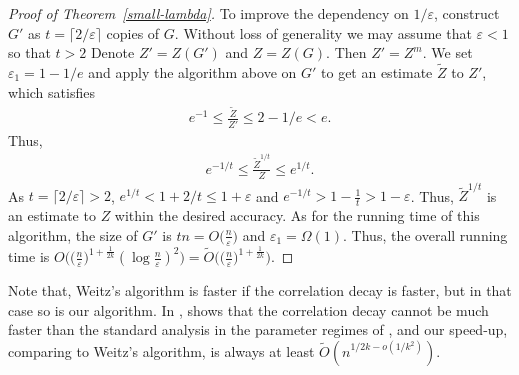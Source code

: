 \documentclass{theoretics}
\newcommand{\ceil}[1]{\lceil#1\rceil}
\newcommand{\eps}{\varepsilon}
\begin{document}
\begin{proof}[Proof of Theorem~\ref{small-lambda}]
  To improve the dependency on $1/\eps$,
  construct $G'$ as $t=\ceil{2/\eps}$ copies of $G$.
  Without loss of generality we may assume that $\eps<1$ so that $t>2$
  Denote $Z'=Z(G')$ and $Z=Z(G)$.
  Then $Z'=Z^m$.
  We set $\eps_1=1-1/e$ and apply the algorithm above on $G'$ to get an estimate $\widetilde{Z}$ to $Z'$,
  which satisfies
  \begin{align*}
    e^{-1}\le\frac{\widetilde{Z}}{Z'}\le 2-1/e < e.
  \end{align*}
  Thus,
  \begin{align*}
    e^{-1/t}\le \frac{\widetilde{Z}^{1/t}}{Z} \le e^{1/t}.
  \end{align*}
  As $t=\ceil{2/\eps}>2$, $e^{1/t}<1+2/t\le 1+ \eps$ and $e^{-1/t} > 1-\frac{1}{t}>1-\eps$. 
  Thus, $\widetilde{Z}^{1/t}$ is an estimate to $Z$ within the desired accuracy.
  As for the running time of this algorithm, 
  the size of $G'$ is $t n=O\big(\frac{n}{\eps}\big)$ and $\eps_1=\Omega(1)$.
  Thus, the overall running time is $O\big( \big( \frac{n}{\eps} \big)^{1+\frac{1}{2k}}(\log \frac{n}{\eps})^2 \big)=\widetilde{O}\big( \big( \frac{n}{\eps} \big)^{1+\frac{1}{2k}} \big)$.
\end{proof}

Note that, Weitz's algorithm is faster if the correlation decay is faster,
but in that case so is our algorithm.
In ,
 shows that the correlation decay cannot be much faster than the standard analysis in the parameter regimes of ,
and our speed-up, comparing to Weitz's algorithm, is always at least $\widetilde{O}(n^{1/2k-o(1/k^2)})$.

%
%
\end{document}
